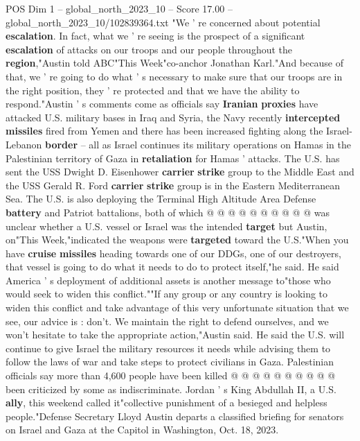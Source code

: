 \begin{textsample}{POS Dim 1 – global\_north\_2023\_10 – Score 17.00 – global\_north\_2023\_10/102839364.txt}  \label{ex:f1_pos_150}
"We ' re concerned about potential \textbf{escalation}.
In fact, what we ' re seeing is the prospect of a significant \textbf{escalation} of attacks on our troops and our people throughout the \textbf{region},"Austin told ABC"This Week"co-anchor Jonathan Karl."And because of that, we ' re going to do what ' s necessary to make sure that our troops are in the right position, they ' re protected and that we have the ability to respond."Austin ' s comments come as officials say \textbf{Iranian} \textbf{proxies} have attacked U.S. military bases in Iraq and Syria, the Navy recently \textbf{intercepted} \textbf{missiles} fired from Yemen and there has been increased fighting along the Israel-Lebanon \textbf{border} -- all as Israel continues its military operations on Hamas in the Palestinian territory of Gaza in \textbf{retaliation} for Hamas ' attacks.
The U.S. has sent the USS Dwight D.
Eisenhower \textbf{carrier} \textbf{strike} group to the Middle East and the USS Gerald R.
Ford \textbf{carrier} \textbf{strike} group is in the Eastern Mediterranean Sea.
The U.S. is also deploying the Terminal High Altitude Area Defense \textbf{battery} and Patriot battalions, both of which @ @ @ @ @ @ @ @ @ @ was unclear whether a U.S. vessel or Israel was the intended \textbf{target} but Austin, on"This Week,"indicated the weapons were \textbf{targeted} toward the U.S."When you have \textbf{cruise} \textbf{missiles} heading towards one of our DDGs, one of our destroyers, that vessel is going to do what it needs to do to protect itself,"he said.
He said America ' s deployment of additional assets is another message to"those who would seek to widen this conflict.""If any group or any country is looking to widen this conflict and take advantage of this very unfortunate situation that we see, our advice is : don't.
We maintain the right to defend ourselves, and we won't hesitate to take the appropriate action,"Austin said.
He said the U.S. will continue to give Israel the military resources it needs while advising them to follow the laws of war and take steps to protect civilians in Gaza.
Palestinian officials say more than 4,600 people have been killed @ @ @ @ @ @ @ @ @ @ been criticized by some as indiscriminate.
Jordan ' s King Abdullah II, a U.S. \textbf{ally}, this weekend called it"collective punishment of a besieged and helpless people."Defense Secretary Lloyd Austin departs a classified briefing for senators on Israel and Gaza at the Capitol in Washington, Oct. 18, 2023.

\end{textsample}
